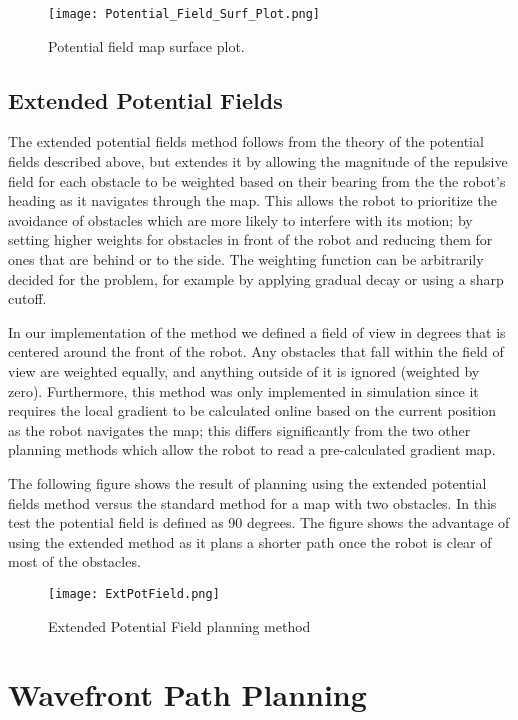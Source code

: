 \documentclass[11pt]{article} %
\begin{document}
\begin{figure}[hbt]
 \centering
 \texttt{[image: Potential\_Field\_Surf\_Plot.png]}
 \caption{Potential field map surface plot.}
 \label{potField_Surf}
\end{figure}


\subsection{Extended Potential Fields}
The extended potential fields method follows from the theory of the potential fields described above, but extendes it by allowing the magnitude of the repulsive field for each obstacle to be weighted based on their bearing from the the robot's heading as it navigates through the map. This allows the robot to prioritize the avoidance of obstacles which are more likely to interfere with its motion; by setting higher weights for obstacles in front of the robot and reducing them for ones that are behind or to the side. The weighting function can be arbitrarily decided for the problem, for example by applying gradual decay or using a sharp cutoff.

In our implementation of the method we defined a field of view in degrees that is centered around the front of the robot. Any obstacles that fall within the field of view are weighted equally, and anything outside of it is ignored (weighted by zero). Furthermore, this method was only implemented in simulation since it requires the local gradient to be calculated online based on the current position as the robot navigates the map; this differs significantly from the two other planning methods which allow the robot to read a pre-calculated gradient map.

The following figure shows the result of planning using the extended potential fields method versus the standard method for a map with two obstacles. In this test the potential field is defined as 90 degrees. The figure shows the advantage of using the extended method as it plans a shorter path once the robot is clear of most of the obstacles.

\begin{figure}[hbt]
 \centering
 \texttt{[image: ExtPotField.png]}
 \caption{Extended Potential Field planning method}
 \label{ExtPotField}
\end{figure}
\clearpage
\section{Wavefront Path Planning}
\end{document}
